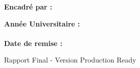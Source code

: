 \begin{titlepage}
\begin{minipage}{0.45\textwidth}
\begin{flushleft}
            \textbf{Encadré par :}\\
            \encadrant
        \end{flushleft}
    \end{minipage}
    \hfill
    \begin{minipage}{0.45\textwidth}
        \begin{flushright}
            \textbf{Année Universitaire :}\\
            \annee\\[1cm]
            
            \textbf{Date de remise :}\\
            \dateremise
        \end{flushright}
    \end{minipage}
    
    \vfill
    
    {\large \textcolor{housygray}{Rapport Final - Version Production Ready}}
    
\end{titlepage}
